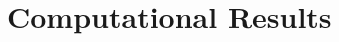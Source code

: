 \documentclass[runningheads,a4paper]{elsarticle}
\begin{document}

	
	\section{Computational Results}
\end{document}
